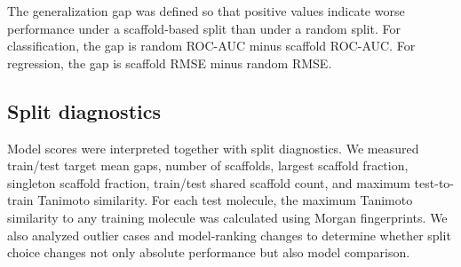 The generalization gap was defined so that positive values indicate worse performance under a scaffold-based split than under a random split. For classification, the gap is random ROC-AUC minus scaffold ROC-AUC. For regression, the gap is scaffold RMSE minus random RMSE.

\subsection{Split diagnostics}

Model scores were interpreted together with split diagnostics. We measured train/test target mean gaps, number of scaffolds, largest scaffold fraction, singleton scaffold fraction, train/test shared scaffold count, and maximum test-to-train Tanimoto similarity. For each test molecule, the maximum Tanimoto similarity to any training molecule was calculated using Morgan fingerprints. We also analyzed outlier cases and model-ranking changes to determine whether split choice changes not only absolute performance but also model comparison.
